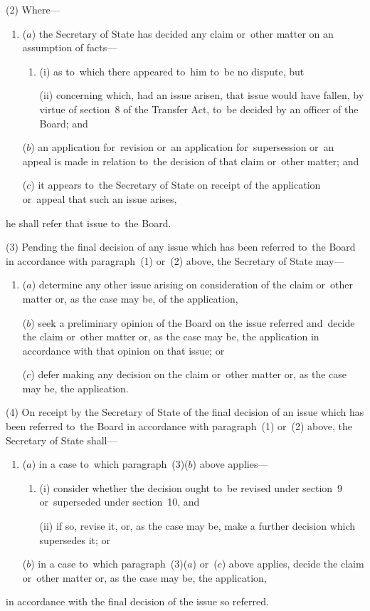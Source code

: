 \documentclass[12pt,a4paper]{article}
\begin{document}
(2) Where—
\begin{enumerate}\item[]
($a$) the Secretary of State has decided any claim or~other matter on an assumption of facts—
\begin{enumerate}\item[]
(i) as to~which there appeared to~him to~be no dispute, but

(ii) concerning which, had an issue arisen, that issue would have fallen, by virtue of section~8 of the Transfer Act, to~be decided by an officer of the Board; and
\end{enumerate}

($b$) an application for~revision or~an application for~supersession 
or~an appeal  %
is made in relation to~the decision of that claim or~other matter; and

($c$) it appears to~the Secretary of State on 
receipt of the application or~appeal  %
that such an issue arises,
\end{enumerate}
he shall refer that issue to~the Board.

(3) Pending the final decision of any issue which has been referred to~the Board in accordance with paragraph~(1) or~(2) above, the Secretary of State may—
\begin{enumerate}\item[]
($a$) determine any other issue arising on consideration of the claim or~other matter or, as the case may be, of the application,

($b$) seek a preliminary opinion of the Board on the issue referred and~decide the claim or~other matter or, as the case may be, the application in accordance with that opinion on that issue; or

($c$) defer making any decision on the claim or~other matter or, as the case may be, the application.
\end{enumerate}

(4) On receipt by the Secretary of State of the final decision of an issue which has been referred to~the Board in accordance with paragraph~(1) or~(2) above, the Secretary of State shall—
\begin{enumerate}\item[]
($a$) in a case to~which paragraph~(3)($b$) above applies—
\begin{enumerate}\item[]
(i) consider whether the decision ought to~be revised under section~9 or~superseded under section~10, and

(ii) if so, revise it, or, as the case may be, make a further decision which supersedes it; or
\end{enumerate}

($b$) in a case to~which paragraph~(3)($a$) or~($c$) above applies, decide the claim or~other matter or, as the case may be, the application,
\end{enumerate}
in accordance with the final decision of the issue so referred.
\end{document}
